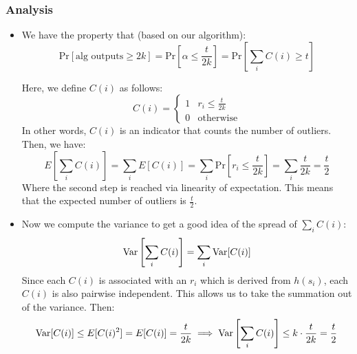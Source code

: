 \subsubsection{Analysis}
\begin{itemize}
	\item We have the property that (based on our algorithm):
		\[
		\mathrm{Pr}[\text{alg outputs} \ge  2k] = \mathrm{Pr}\left[\alpha \le  \frac{t}{2k}\right] = 
		\mathrm{Pr}\left[ \sum_i C(i) \ge  t \right] 
		\] 



		Here, we define \( C(i)  \) as follows:
		\[
		C(i) = \begin{cases}
			1 & r_i \le  \frac{t}{2k}\\
			0 & \text{otherwise}
		\end{cases}
		\] 
		In other words, \( C(i) \) is an indicator that counts the number of outliers. Then, we have:
		\[
			E\left[ \sum_{i} C(i) \right]  = \sum_{i} E[C(i)] = \sum_i \mathrm{Pr}\left[ r_i\le \frac{t}{2k} \right] = \sum_i \frac{t}{2k} = \frac{t}{2}
		\] 
		Where the second step is reached via linearity of expectation. This means that the expected 
		number of outliers is \( \frac{t}{2} \).

	\item Now we compute the variance to get a good idea of the spread of \( \sum_i C(i) \):
		\[
			\mathrm{Var}\left[\sum_i C(i)\right] = \sum_i \mathrm{Var}[C(i)] 
		\] 
		Since each \( C(i) \) is associated with an \( r_i \) which is derived from \( h(s_i) \), each 
		\( C(i) \) is also pairwise independent. This allows us to take the summation out of the variance. Then:
		\[
			\mathrm{Var}[C(i)] \le  E[C(i)^2] = E[C(i)] = \frac{t}{2k} \implies \mathrm{Var}\left[ \sum_i C(i) \right] \le k 
			\cdot \frac{t}{2k} = \frac{t}{2}
		\] 
\end{itemize}

